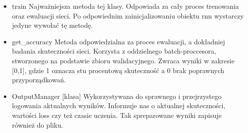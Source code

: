\begin{itemize}

  \item{train}
  \newline Najważniejsza metoda tej klasy. Odpowiada za cały proces trenowania oraz ewaluacji sieci. Po 
  odpowiednim zainicjalizowaniu obiektu rnn wystarczy jedyne wywołać tę metodę.
  \item{get\_accuracy}
  \newline Metoda odpowiedzialna za proces ewaluacji, a dokładniej badania skuteczności sieci. Korzysta z 
  oddzielnego batch-proccesora, stworzonego na podstawie zbioru walidacyjnego. Zwraca wyniki w zakresie
  [0,1], gdzie 1 oznacza stu procentową skuteczność a 0 brak poprawnych przyporządkowań.
  \item{OutputManager [klasa]}
  \newline Wykorzystywana do sprawnego i przejrzystego logowania aktualnych wyników. Informuje nas o aktualnej
  skuteczności, wartości loss czy też czasie uczenia. Tak spreparowane wyniki zapisuje również do pliku.

\end{itemize}